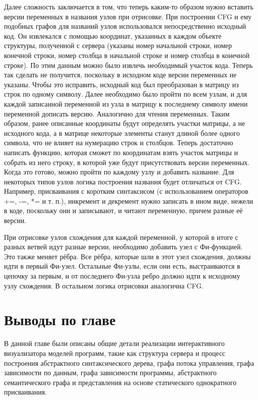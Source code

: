 Далее сложность заключается в том, что теперь каким-то образом нужно вставить версии переменных в названия узлов при отрисовке. При построении CFG и ему подобных графов для названий узлов использовался непосредственно исходный код. Он извлекался с помощью координат, указанных в каждом объекте структуры, полученной с сервера (указаны номер начальной строки, номер конечной строки, номер столбца в начальной строке и номер столбца в конечной строке). По этим данным можно было извлечь необходимый участок кода. Теперь так сделать не получится, поскольку в исходном коде версии переменных не указаны. Чтобы это исправить, исходный код был преобразован в матрицу из строк по одному символу. Далее необходимо было пройти по всем узлам, и для каждой записанной переменной из узла в матрицу к последнему символу имени переменной дописать версию. Аналогично для чтения переменных. Таким образом, ранее описанные координаты будут определять участки матрицы, а не исходного кода, а в матрице некоторые элементы станут длиной более одного символа, что не влияет на нумерацию строк и столбцов. Теперь достаточно написать функцию, которая сможет по координатам взять участок матрицы и собрать из него строку, в которой уже будут присутствовать версии переменных. Когда это готово, можно пройти по каждому узлу и добавить название. Для некоторых типов узлов логика построения названия будет отличаться от CFG. Например, присваивания с коротким синтаксисом (с использованием операторов +=, -=, *= и т. п.), инкремент и декремент нужно записать в ином виде, нежели в коде, поскольку они и записывают, и читают переменную, причем разные её версии.

При отрисовке узлов схождения для каждой переменной, у которой в итоге с разных ветвей идут разные версии, необходимо добавить узел с Фи-функцией. Это также меняет рёбра. Все рёбра, которые шли в этот узел схождения, должны идти в первый Фи-узел. Остальные Фи-узлы, если они есть, выстраиваются в цепочку за первым, и от последнего Фи-узла ребро должно идти к исходному узлу схождения. В остальном логика отрисовки аналогична CFG.

\section{Выводы по главе} \label{ch5:sec3}
В данной главе были описаны общие детали реализации интерактивного визуализатора моделей программ, такие как структура сервера и процесс построения абстрактного синтаксического дерева, графа потока управления, графа зависимости по данным, графа зависимости программы, абстрактного семантического графа и представления на основе статического однократного присваивания.
\newpage